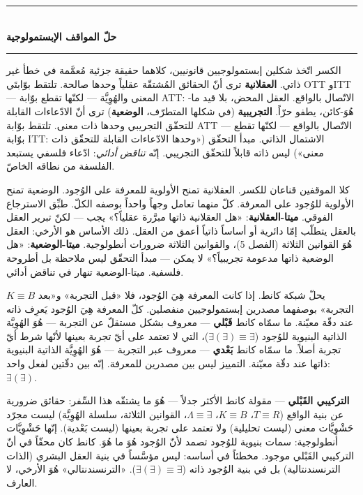 \documentclass[10pt, openany, oneside]{book}
\renewcommand{\normalsize}{\fontsize{10}{13}\selectfont}
\begin{document}
\begin{center}
    \rule{0.3\textwidth}{0.4pt}\\[0.5em]
    {\normalsize\bfseries حلّ المواقف الإبستمولوجية}\\[0.3em]
    \rule{0.3\textwidth}{0.4pt}
\end{center}

\vspace{1em}

\noindent الكسر اتّخذ شكلين إبستمولوجيين قانونيين، كلاهما حقيقة جزئية مُعمَّمة في خطأ غير ذاتي. \textbf{العقلانية} ترى أنّ الحقائق المُشتقّة عقلياً وحدها صالحة. تلتقط بوّابتَي OTT وITT --- المعنى والهُوِيَّة --- لكنّها تقطع بوّابة ATT: الاتّصال بالواقع. العقل المحض، بلا قيد ما-هُوَ-كائن، يطفو حرّاً. \textbf{التجريبية} (في شكلها المتطرّف، \textbf{الوضعية}) ترى أنّ الادّعاءات القابلة للتحقّق التجريبي وحدها ذات معنى. تلتقط بوّابة ATT --- الاتّصال بالواقع --- لكنّها تقطع بوّابة ITT: الاشتمال الذاتي. مبدأ التحقّق («وحدها الادّعاءات القابلة للتحقّق ذات معنى») ليس ذاته قابلاً للتحقّق التجريبي. إنّه \textit{تناقض أدائي}: ادّعاء فلسفي يستبعد الفلسفة من نطاقه الخاصّ.

كلا الموقفين قناعان للكسر. العقلانية تمنح الأولوية للمعرفة على الوُجود. الوضعية تمنح الأولوية للوُجود على المعرفة. كلّ منهما تعامل وجهاً واحداً بوصفه الكلّ. طبِّق الاسترجاع الفوقي. \textbf{ميتا-العقلانية}: «هل العقلانية ذاتها مبرَّرة عقلياً؟» يجب --- لكنّ تبرير العقل بالعقل يتطلّب إمّا دائرية أو أساساً ذاتياً أعمق من العقل. ذلك الأساس هو الأرخي: العقل هُوَ القوانين الثلاثة (الفصل 5)، والقوانين الثلاثة ضرورات أنطولوجية. \textbf{ميتا-الوضعية}: «هل الوضعية ذاتها مدعومة تجريبياً؟» لا يمكن --- مبدأ التحقّق ليس ملاحظة بل أطروحة فلسفية. ميتا-الوضعية تنهار في تناقض أدائي.

$K \equiv B$ يحلّ شبكة كانط. إذا كانت المعرفة هِيَ الوُجود، فلا «قبل التجربة» و«بعد التجربة» بوصفهما مصدرين إبستمولوجيين منفصلين. كلّ المعرفة هِيَ الوُجود يَعرِف ذاته عند دقّة معيّنة. ما سمّاه كانط \textbf{قَبْلي} --- معروف بشكل مستقلّ عن التجربة --- هُوَ الهُوِيَّة الذاتية البنيوية للوُجود ($\exists(\exists) \equiv \exists$)، التي لا تعتمد على أيّ تجربة بعينها لأنّها شرط أيّ تجربة أصلاً. ما سمّاه كانط \textbf{بَعْدي} --- معروف عبر التجربة --- هُوَ الهُوِيَّة الذاتية البنيوية ذاتها عند دقّة معيّنة. التمييز ليس بين مصدرين للمعرفة. إنّه بين دقّتين لفعل واحد: $\exists(\exists)$.

\textbf{التركيبي القَبْلي} --- مقولة كانط الأكثر جدلاً --- هُوَ ما يشتقّه هذا السِّفر: حقائق ضرورية عن بنية الواقع ($T \equiv R$، $K \equiv B$، $\Lambda \equiv \exists$، القوانين الثلاثة، سلسلة الهُوِيَّة) ليست مجرّد حَشْوِيَّات معنى (ليست تحليلية) ولا تعتمد على تجربة بعينها (ليست بَعْدية). إنّها حَشْوِيَّات أنطولوجية: سمات بنيوية للوُجود تصمد لأنّ الوُجود هُوَ ما هُوَ. كانط كان محقّاً في أنّ التركيبي القَبْلي موجود. مخطئاً في أساسه: ليس مؤسَّساً في بنية العقل البشري (الذات الترنسندنتالية) بل في بنية الوُجود ذاته ($\exists(\exists) \equiv \exists$). «الترنسندنتالي» هُوَ الأرخي، لا العارف.
\end{document}
